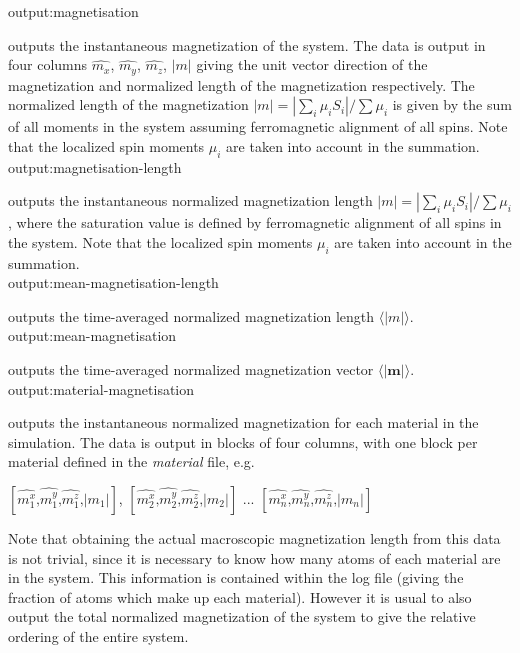 {\zicf output:magnetisation} outputs the instantaneous magnetization of the system. The data is output in four columns $\hat{m_x}$, $\hat{m_y}$, $\hat{m_z}$, $|m|$ giving the unit vector direction of the magnetization and normalized length of the magnetization respectively. The normalized length of the magnetization $|m| = |\sum_i \mu_i S_i| / \sum \mu_i$ is given by the sum of all moments in the system assuming ferromagnetic alignment of all spins. Note that the localized spin moments $\mu_i$ are taken into account in the summation.\\

{\zicf output:magnetisation-length} outputs the instantaneous normalized magnetization length $|m| = |\sum_i \mu_i S_i| / \sum \mu_i$, where the saturation value is defined by ferromagnetic alignment of all spins in the system. Note that the localized spin moments $\mu_i$ are taken into account in the summation.\\

{\zicf output:mean-magnetisation-length} outputs the time-averaged normalized magnetization length $\langle|m|\rangle$.\\

{\zicf output:mean-magnetisation} outputs the time-averaged normalized magnetization vector $\langle|\mathbf{m}|\rangle$.\\

{\zicf output:material-magnetisation} outputs the instantaneous normalized magnetization for each material in the simulation. The data is output in blocks of four columns, with one block per material defined in the \textit{material} file, e.g.

\begin{center}
$\left[ \hat{m_1^x} \textrm{,} \hat{m_1^y} \textrm{,} \hat{m_1^z} \textrm{,} |m_1| \right]$,
$\left[ \hat{m_2^x} \textrm{,} \hat{m_2^y} \textrm{,} \hat{m_2^z} \textrm{,} |m_2| \right]$ ...
$\left[ \hat{m_n^x} \textrm{,} \hat{m_n^y} \textrm{,} \hat{m_n^z} \textrm{,} |m_n| \right]$
\end{center}

Note that obtaining the actual macroscopic magnetization length from this data is not trivial, since it is necessary to know how many atoms of each material are in the system. This information is contained within the log file (giving the fraction of atoms which make up each material). However it is usual to also output the total normalized magnetization of the system to give the relative ordering of the entire system.\\

